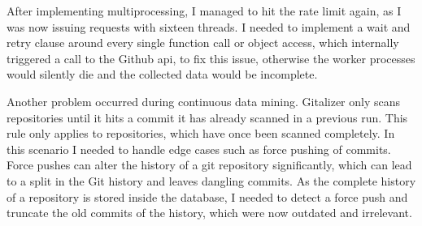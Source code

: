 After implementing multiprocessing, I managed to hit the rate limit again, as I was now issuing requests with sixteen threads.
I needed to implement a wait and retry clause around every single function call or object access, which internally triggered a call to the Github \ac{api}, to fix this issue, otherwise the worker processes would silently die and the collected data would be incomplete.

Another problem occurred during continuous data mining.
Gitalizer only scans repositories until it hits a commit it has already scanned in a previous run.
This rule only applies to repositories, which have once been scanned completely.
In this scenario I needed to handle edge cases such as force pushing of commits.
Force pushes can alter the history of a git repository significantly, which can lead to a split in the Git history and leaves dangling commits.
As the complete history of a repository is stored inside the database, I needed to detect a force push and truncate the old commits of the history, which were now outdated and irrelevant.

